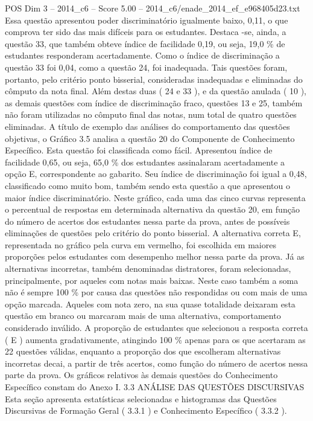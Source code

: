 \begin{textsample}{POS Dim 3 – 2014\_c6 – Score 5.00 – 2014\_c6/enade\_2014\_ef\_e968405d23.txt}
Essa questão apresentou poder discriminatório igualmente baixo, 0,11, o que comprova ter sido das mais difíceis para os estudantes.
Destaca -se, ainda, a questão 33, que também obteve índice de facilidade 0,19, ou seja, 19,0 \% de estudantes responderam acertadamente.
Como o índice de discriminação a questão 33 foi 0,04, como a questão 24, foi inadequada.
Tais questões foram, portanto, pelo critério ponto bisserial, consideradas inadequadas e eliminadas do cômputo da nota final.
Além destas duas ( 24 e 33 ), e da questão anulada ( 10 ), as demais questões com índice de discriminação fraco, questões 13 e 25, também não foram utilizadas no cômputo final das notas, num total de quatro questões eliminadas.
A título de exemplo das análises do comportamento das questões objetivas, o Gráfico 3.5 analisa a questão 20 do Componente de Conhecimento Específico.
Esta questão foi classificada como fácil.
Apresentou índice de facilidade 0,65, ou seja, 65,0 \% dos estudantes assinalaram acertadamente a opção E, correspondente ao gabarito.
Seu índice de discriminação foi igual a 0,48, classificado como muito bom, também sendo esta questão a que apresentou o maior índice discriminatório.
Neste gráfico, cada uma das cinco curvas representa o percentual de respostas em determinada alternativa da questão 20, em função do número de acertos dos estudantes nessa parte da prova, antes de possíveis eliminações de questões pelo critério do ponto bisserial.
A alternativa correta E, representada no gráfico pela curva em vermelho, foi escolhida em maiores proporções pelos estudantes com desempenho melhor nessa parte da prova.
Já as alternativas incorretas, também denominadas distratores, foram selecionadas, principalmente, por aqueles com notas mais baixas.
Neste caso também a soma não é sempre 100 \% por causa das questões não respondidas ou com mais de uma opção marcada.
Aqueles com nota zero, na sua quase totalidade deixaram esta questão em branco ou marcaram mais de uma alternativa, comportamento considerado inválido.
A proporção de estudantes que selecionou a resposta correta ( E ) aumenta gradativamente, atingindo 100 \% apenas para os que acertaram as 22 questões válidas, enquanto a proporção dos que escolheram alternativas incorretas decai, a partir de três acertos, como função do número de acertos nessa parte da prova.
Os gráficos relativos às demais questões do Conhecimento Específico constam do Anexo I. 3.3 ANÁLISE DAS QUESTÕES DISCURSIVAS Esta seção apresenta estatísticas selecionadas e histogramas das Questões Discursivas de Formação Geral ( 3.3.1 ) e Conhecimento Específico ( 3.3.2 ).

\end{textsample}
